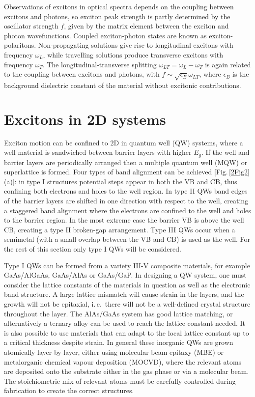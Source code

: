 Observations of excitons in optical spectra depends on the coupling between excitons and photons, so exciton peak strength is partly determined by the oscillator strength $f$, given by the matrix element between the exciton and photon wavefunctions. Coupled exciton-photon states are known as exciton-polaritons. Non-propagating solutions give rise to longitudinal excitons with frequency $\omega_L$, while travelling solutions produce transverse excitons with frequency $\omega_T$. The longitudinal-transverse splitting $\omega_{LT} = \omega_L - \omega_T$ is again related to the coupling between excitons and photons, with $f \sim \sqrt{\epsilon_B} \omega_{LT}$, where $\epsilon_B$ is the background dielectric constant of the material without excitonic contributions.

\section{Excitons in 2D systems}
\label{sec:ex2D}
Exciton motion can be confined to 2D in quantum well (QW) systems, where a well material is sandwiched between barrier layers with higher $E_g$. If the well and barrier layers are periodically arranged then a multiple quantum well (MQW) or superlattice is formed. Four types of band alignment can be achieved [Fig.\,\ref{2Fig2}(a)]: in type I structures potential steps appear in both the VB and CB, thus confining both electrons and holes to the well region. In type II QWs band edges of the barrier layers are shifted in one direction with respect to the well, creating a staggered band alignment where the electrons are confined to the well and holes to the barrier region. In the most extreme case the barrier VB is above the well CB, creating a type II broken-gap arrangement. Type III QWs occur when a semimetal (with a small overlap between the VB and CB) is used as the well. For the rest of this section only type I QWs will be considered.

Type I QWs can be formed from a variety III-V composite materials, for example GaAs/AlGaAs, GaAs/AlAs or GaAs/GaP. In designing a QW system, one must consider the lattice constants of the materials in question as well as the electronic band structure. A large lattice mismatch will cause strain in the layers, and the growth will not be epitaxial, i.\,e.\, there will not be a well-defined crystal structure throughout the layer. The AlAs/GaAs system has good lattice matching, or alternatively a ternary alloy can be used to reach the lattice constant needed. It is also possible to use materials that can adapt to the local lattice constant up to a critical thickness despite strain. In general these inorganic QWs are grown atomically layer-by-layer, either using molecular beam epitaxy (MBE) or metalorganic chemical vapour deposition (MOCVD), where the relevant atoms are deposited onto the substrate either in the gas phase or via a molecular beam. The stoichiometric mix of relevant atoms must be carefully controlled during fabrication to create the correct structures. 


